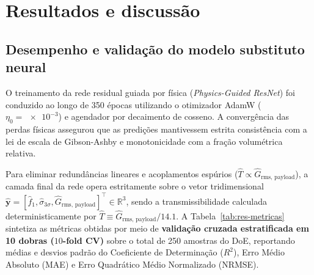\chapter{Resultados e discussão}
\label{cap:resultados}

\section{Desempenho e validação do modelo substituto neural}
\label{sec:res-neural}

O treinamento da rede residual guiada por física (\textit{Physics-Guided ResNet}) foi conduzido ao longo de 350 épocas utilizando o otimizador AdamW ($\eta_0 = \num{e-3}$) e agendador por decaimento de cosseno. A convergência das perdas físicas assegurou que as predições mantivessem estrita consistência com a lei de escala de Gibson-Ashby e monotonicidade com a fração volumétrica relativa.

Para eliminar redundâncias lineares e acoplamentos espúrios ($\hat{T} \propto \hat{G}_{\text{rms, payload}}$), a camada final da rede opera estritamente sobre o vetor tridimensional $\hat{\mathbf{y}} = [\hat{f}_1, \hat{\sigma}_{3\sigma}, \hat{G}_{\text{rms, payload}}]^\top \in \mathbb{R}^3$, sendo a transmissibilidade calculada deterministicamente por $\hat{T} \equiv \hat{G}_{\text{rms, payload}} / \num{14.1}$. A Tabela~\ref{tab:res-metricas} sintetiza as métricas obtidas por meio de \textbf{validação cruzada estratificada em 10 dobras ($10$-fold CV)} sobre o total de 250 amostras do DoE, reportando médias e desvios padrão do Coeficiente de Determinação ($R^2$), Erro Médio Absoluto (MAE) e Erro Quadrático Médio Normalizado (NRMSE).

